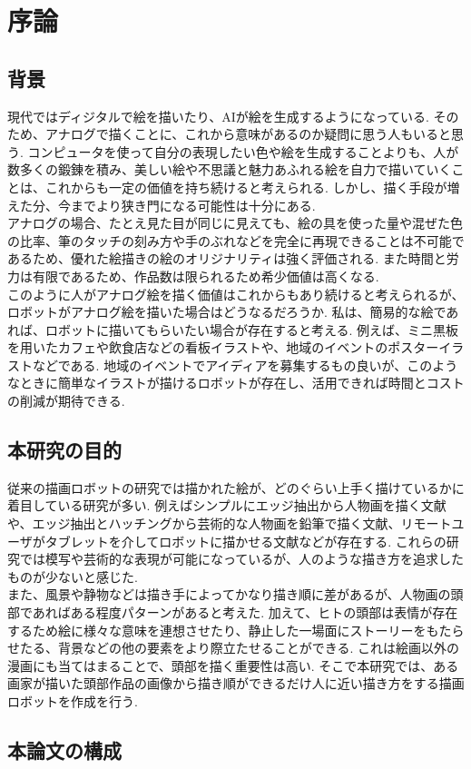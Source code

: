 \chapter{序論}
  \label{chap:intro}
  \section{背景}
    \label{sec:background}
	現代ではディジタルで絵を描いたり、AIが絵を生成するようになっている.	そのため、アナログで描くことに、これから意味があるのか疑問に思う人もいると思う. コンピュータを使って自分の表現したい色や絵を生成することよりも、人が数多くの鍛錬を積み、美しい絵や不思議と魅力あふれる絵を自力で描いていくことは、これからも一定の価値を持ち続けると考えられる. しかし、描く手段が増えた分、今までより狭き門になる可能性は十分にある. 
	\\\hspace{10pt}アナログの場合、たとえ見た目が同じに見えても、絵の具を使った量や混ぜた色の比率、筆のタッチの刻み方や手のぶれなどを完全に再現できることは不可能であるため、優れた絵描きの絵のオリジナリティは強く評価される.	また時間と労力は有限であるため、作品数は限られるため希少価値は高くなる. 
	\\\hspace{10pt}このように人がアナログ絵を描く価値はこれからもあり続けると考えられるが、ロボットがアナログ絵を描いた場合はどうなるだろうか. 私は、簡易的な絵であれば、ロボットに描いてもらいたい場合が存在すると考える. 例えば、ミニ黒板を用いたカフェや飲食店などの看板イラストや、地域のイベントのポスターイラストなどである. 地域のイベントでアイディアを募集するもの良いが、このようなときに簡単なイラストが描けるロボットが存在し、活用できれば時間とコストの削減が期待できる. 
  \section{本研究の目的}
    \label{sec:target}
	従来の描画ロボットの研究では描かれた絵が、どのぐらい上手く描けているかに着目している研究が多い. 例えばシンプルにエッジ抽出から人物画を描く文献\cite{1}や、エッジ抽出とハッチングから芸術的な人物画を鉛筆で描く文献\cite{2}、リモートユーザがタブレットを介してロボットに描かせる文献\cite{3}などが存在する. これらの研究では模写や芸術的な表現が可能になっているが、人のような描き方を追求したものが少ないと感じた.
	\\\hspace{10pt}また、風景や静物などは描き手によってかなり描き順に差があるが、人物画の頭部であればある程度パターンがあると考えた.  加えて、ヒトの頭部は表情が存在するため絵に様々な意味を連想させたり、静止した一場面にストーリーをもたらせたる、背景などの他の要素をより際立たせることができる. これは絵画以外の漫画にも当てはまることで、頭部を描く重要性は高い.	そこで本研究では、ある画家が描いた頭部作品の画像から描き順ができるだけ人に近い描き方をする描画ロボットを作成を行う.\\
	

	\section{本論文の構成}
    \label{sec:construction_of_this_paper}
    
